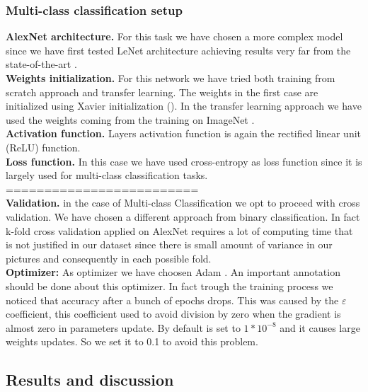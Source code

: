 \subsubsection{Multi-class classification setup}
\textbf{AlexNet architecture.}
For this task we have chosen a more complex model since we have first tested LeNet architecture achieving results very far from the state-of-the-art \cite{ref11}.
\\
\textbf{Weights initialization.}
For this network we have tried both training from scratch approach and transfer learning. The weights in the first case are initialized using Xavier initialization (\cite{ref31}). In the transfer learning approach we have used the weights coming from the training on ImageNet \cite{imagenet}.
\\
\textbf{Activation function.}
Layers activation function is again the rectified linear unit (ReLU) function.
\\
\textbf{Loss function.}
In this case we have used cross-entropy as loss function since it is largely used for multi-class classification tasks.
=========================
\\
\textbf{Validation.}
in the case of Multi-class Classification we opt to proceed with cross validation. We have chosen a different approach from binary classification. In fact k-fold cross validation applied on AlexNet requires a lot of computing time that is not justified in our dataset since there is small amount of variance in our pictures and consequently in each possible fold.
\\
\textbf{Optimizer:}
As optimizer we have choosen Adam \cite{ref32}. An important annotation should be done about this optimizer. In fact trough the training process we noticed that accuracy after a bunch of epochs drops. This was caused by the $\varepsilon$ coefficient, this coefficient used to avoid division by zero when the gradient is almost zero in parameters update.  By default is set to $1*10^{-8}$ and it causes large weights updates. So we set it to 0.1 to avoid this problem.



\subsection{Results and discussion}
